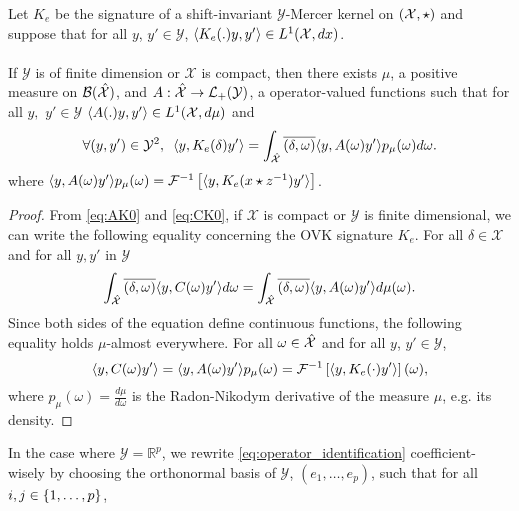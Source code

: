 \begin{proposition}
\label{pr:spectral}
Let $K_e$ be the signature of a shift-invariant $\mathcal{Y}$-Mercer kernel on $(\mathcal{X}, \star)$ and suppose that for all $y$, $y' \in\mathcal{Y}$, $\langle K_e(.)y,y'\rangle\in L^1(\mathcal{X},dx)$. 
\paragraph{}
If $\mathcal{Y}$ is of finite dimension or $\mathcal{X}$ is compact, then there exists $\mu$, a positive measure on $\mathcal{B}(\mathcal{\hat{\mathcal{X}}})$, and $A:\hat{\mathcal{X}}\to \mathcal{L}_+(\mathcal{Y})$, a operator-valued functions such that for all $y,$ $y'\in\mathcal{Y}$ $\langle A(.)y,y'\rangle\in L^1(\mathcal{X},d\mu)$ and
\begin{equation*}
\forall (y,y')\in\mathcal{Y}^2, \enskip \langle y, K_e(\delta)y'\rangle=\int_{\hat{\mathcal{X}}}\overline{(\delta, \omega)}\langle y, A(\omega)y'\rangle p_{\mu}(\omega)d\omega.
\end{equation*}
where $\langle y, A(\omega)y'\rangle p_{\mu}(\omega) = \mathcal{F}^{-1}\left[\langle y, K_e(x\star {z}^{-1})y'\rangle\right]$.
\end{proposition}
\begin{proof}
From \cref{eq:AK0} and \cref{eq:CK0}, if $\mathcal{X}$ is compact or $\mathcal{Y}$ is finite dimensional, we can write the following equality concerning the \acs{OVK} signature $K_e$. For all $\delta \in \mathcal{X}$ and for all $y, y'$ in $\mathcal{Y}$
\begin{equation*}
\int_{\hat{\mathcal{X}}}\overline{(\delta, \omega)}\langle y, C(\omega)y'\rangle d\omega=\int_{\hat{\mathcal{X}}}\overline{(\delta, \omega)}\langle y, A(\omega)y'\rangle d\mu(\omega).
\end{equation*} %
Since both sides of the equation define continuous functions, the following equality holds $\mu$-almost everywhere. For all $\omega \in \hat{\mathcal{X}}$ and for all $y$, $y'\in\mathcal{Y}$,
\begin{equation}
\label{eq:operator_identification}
\langle y, C(\omega)y'\rangle=\langle y, A(\omega)y'\rangle p_{\mu}(\omega)=\mathcal{F}^{-1}\left[\langle y, K_e(\cdot)y'\rangle\right](\omega),
\end{equation}
where $p_{\mu}(\omega)=\frac{d\mu}{d\omega}$ is the Radon-Nikodym derivative of the measure $\mu$, e.g. its density. 
\end{proof}
In the case where $\mathcal{Y}=\mathbb{R}^p$, we rewrite \cref{eq:operator_identification} coefficient-wisely by choosing the orthonormal basis of $\mathcal{Y}$, $(e_1,\ldots, e_p)$, such that for all $ i,j\in {\left\{1, \ldots, p\right\}}$,
